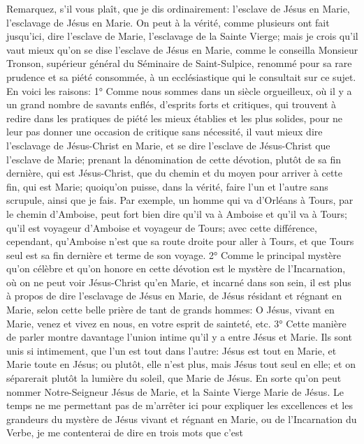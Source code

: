  Remarquez, s'il vous plaît, que je dis ordinairement: l'esclave de Jésus en Marie, l'esclavage de Jésus en
Marie. On peut à la vérité, comme plusieurs ont fait jusqu'ici, dire l'esclave de Marie, l'esclavage de la Sainte
Vierge; mais je crois qu'il vaut mieux qu'on se dise l'esclave de Jésus en Marie, comme le conseilla Monsieur
Tronson, supérieur général du Séminaire de Saint-Sulpice, renommé pour sa rare prudence et sa piété
consommée, à un ecclésiastique qui le consultait sur ce sujet. En voici les raisons:
 1° Comme nous sommes dans un siècle orgueilleux, où il y a un grand nombre de savants enflés, d'esprits
forts et critiques, qui trouvent à redire dans les pratiques de piété les mieux établies et les plus solides, pour ne
leur pas donner une occasion de critique sans nécessité, il vaut mieux dire l'esclavage de Jésus-Christ en Marie,
et se dire l'esclave de Jésus-Christ que l'esclave de Marie; prenant la dénomination de cette dévotion, plutôt de sa
fin dernière, qui est Jésus-Christ, que du chemin et du moyen pour arriver à cette fin, qui est Marie; quoiqu'on
puisse, dans la vérité, faire l'un et l'autre sans scrupule, ainsi que je fais. Par exemple, un homme qui va d'Orléans
à Tours, par le chemin d'Amboise, peut fort bien dire qu'il va à Amboise et qu'il va à Tours; qu'il est voyageur
d'Amboise et voyageur de Tours; avec cette différence, cependant, qu'Amboise n'est que sa route droite pour aller
à Tours, et que Tours seul est sa fin dernière et terme de son voyage.
 2° Comme le principal mystère qu'on célèbre et qu'on honore en cette dévotion est le mystère de
l'Incarnation, où on ne peut voir Jésus-Christ qu'en Marie, et incarné dans son sein, il est plus à propos de dire
l'esclavage de Jésus en Marie, de Jésus résidant et régnant en Marie, selon cette belle prière de tant de grands
hommes: O Jésus, vivant en Marie, venez et vivez en nous, en votre esprit de sainteté, etc.
 3° Cette manière de parler montre davantage l'union intime qu'il y a entre Jésus et Marie. Ils sont unis si
intimement, que l'un est tout dans l'autre: Jésus est tout en Marie, et Marie toute en Jésus; ou plutôt, elle n'est
plus, mais Jésus tout seul en elle; et on séparerait plutôt la lumière du soleil, que Marie de Jésus. En sorte qu'on
peut nommer Notre-Seigneur Jésus de Marie, et la Sainte Vierge Marie de Jésus.
 Le temps ne me permettant pas de m'arrêter ici pour expliquer les excellences et les grandeurs du mystère
de Jésus vivant et régnant en Marie, ou de l'Incarnation du Verbe, je me contenterai de dire en trois mots que c'est
